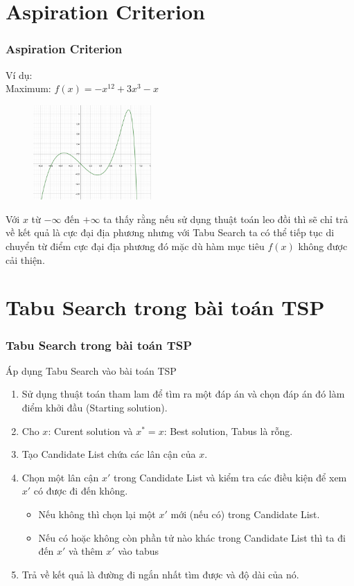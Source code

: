 \documentclass[12pt]{beamer}
\begin{document}
	\section{Aspiration Criterion}
	\begin{frame}
		\frametitle{Aspiration Criterion}
		Ví dụ:\\
		Maximum: $f(x) = -x^{12} + 3x^3 - x$
		\begin{figure}
			\includegraphics[width=4.5cm]{AC.png}
		\end{figure}
		Với $x$ từ $-\infty$ đến $+\infty$ ta thấy rằng nếu sử dụng thuật toán leo đồi thì sẽ chỉ trả về kết quả là cực đại địa phương nhưng với Tabu Search ta có thể tiếp tục di chuyển từ điểm cực đại địa phương đó mặc dù hàm mục tiêu $f(x)$ không được cải thiện.
	\end{frame}
	
	\section{Tabu Search trong bài toán TSP}
	\begin{frame}
		\frametitle{Tabu Search trong bài toán TSP}
		
		Áp dụng Tabu Search vào bài toán TSP\\
		\begin{enumerate}[Bước 1:]
			\item Sử dụng thuật toán tham lam để tìm ra một đáp án và chọn đáp án đó làm điểm khởi đầu (Starting solution).
			\item Cho $x$: Curent solution và $x^* = x$: Best solution, Tabus là rỗng.
			\item Tạo Candidate List chứa các lân cận của $x$.
			\item Chọn một lân cận $x'$ trong Candidate List và kiểm tra các điều kiện để xem $x'$ có được đi đến không.\\
			\begin{itemize}
				\item Nếu không thì chọn lại một $x'$ mới (nếu có) trong Candidate List.
				\item Nếu có hoặc không còn phần tử nào khác trong Candidate List thì ta đi đến $x'$ và thêm $x'$ vào tabus
			\end{itemize}
			\item Trả về kết quả là đường đi ngắn nhất tìm được và độ dài của nó.
		\end{enumerate}
	\end{frame}
\end{document}
